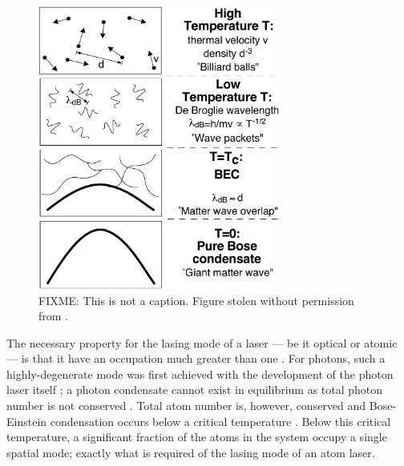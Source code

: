 \begin{figure}
    \centering
    \includegraphics[width=8cm]{WhatIsBEC}
    \caption{
        \label{Introduction:WhatIsBEC}
        FIXME: This is not a caption.  Figure stolen without permission from \citep{Ketterle:1999fk}.
    }
\end{figure}

The necessary property for the lasing mode of a laser --- be it optical or atomic --- is that it have an occupation much greater than one \citep{Wiseman:1997ba}.  For photons, such a highly-degenerate mode was first achieved with the development of the photon laser itself \citep{Maiman:1960,Javan:1961}; a photon condensate cannot exist in equilibrium as total photon number is not conserved \citep{Muller:1986,Ketterle:1999fk}.  Total atom number is, however, conserved and Bose-Einstein condensation occurs below a critical temperature \citep{PethickSmith}.  Below this critical temperature, a significant fraction of the atoms in the system occupy a single spatial mode; exactly what is required of the lasing mode of an atom laser.

